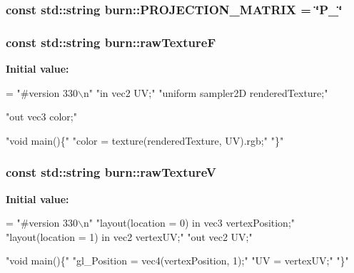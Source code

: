 \hypertarget{namespaceburn_ae5e90743826abef0fbc9d54704ae2a6f}{
\subsubsection[{P\-R\-O\-J\-E\-C\-T\-I\-O\-N\-\_\-\-M\-A\-T\-R\-I\-X}]{\setlength{\rightskip}{0pt plus 5cm}const std\-::string burn\-::\-P\-R\-O\-J\-E\-C\-T\-I\-O\-N\-\_\-\-M\-A\-T\-R\-I\-X = \char`\"{}P\-\_\-\char`\"{}}}\label{namespaceburn_ae5e90743826abef0fbc9d54704ae2a6f}
\hypertarget{namespaceburn_ad03d19988ac03d79b4e2a4714da49c18}{
\subsubsection[{raw\-Texture\-F}]{\setlength{\rightskip}{0pt plus 5cm}const std\-::string burn\-::raw\-Texture\-F}}\label{namespaceburn_ad03d19988ac03d79b4e2a4714da49c18}
{\bfseries Initial value\-:}
\begin{DoxyCode}
= \textcolor{stringliteral}{"#version 330\(\backslash\)n"}
        \textcolor{stringliteral}{"in vec2 UV;"}
        \textcolor{stringliteral}{"uniform sampler2D renderedTexture;"}

        \textcolor{stringliteral}{"out vec3 color;"}

        \textcolor{stringliteral}{"void main()\{"}
            \textcolor{stringliteral}{"color = texture(renderedTexture, UV).rgb;"}
        \textcolor{stringliteral}{"\}"}
\end{DoxyCode}
\hypertarget{namespaceburn_adda519b7f874b2d7f463ee2a761b869f}{
\subsubsection[{raw\-Texture\-V}]{\setlength{\rightskip}{0pt plus 5cm}const std\-::string burn\-::raw\-Texture\-V}}\label{namespaceburn_adda519b7f874b2d7f463ee2a761b869f}
{\bfseries Initial value\-:}
\begin{DoxyCode}
= \textcolor{stringliteral}{"#version 330\(\backslash\)n"}
        \textcolor{stringliteral}{"layout(location = 0) in vec3 vertexPosition;"}
        \textcolor{stringliteral}{"layout(location = 1) in vec2 vertexUV;"}
        \textcolor{stringliteral}{"out vec2 UV;"}

        \textcolor{stringliteral}{"void main()\{"}
            \textcolor{stringliteral}{"gl\_Position = vec4(vertexPosition, 1);"}
            \textcolor{stringliteral}{"UV = vertexUV;"}
        \textcolor{stringliteral}{"\}"}
\end{DoxyCode}
